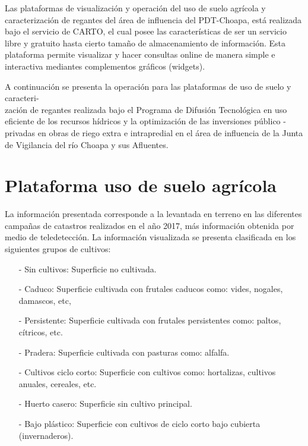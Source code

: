 \documentclass[10pt]{article}
\begin{document}
Las plataformas de visualización y operación del uso de suelo agrícola y caracterización de regantes del área de influencia del PDT-Choapa, está realizada bajo el servicio de CARTO, el cual posee las características de ser un servicio libre y gratuito hasta cierto tamaño de almacenamiento de información. Esta plataforma permite visualizar y hacer consultas online de manera simple e interactiva mediantes complementos gráficos (widgets).  \bigskip\setlength{\parindent}{0pt}

A continuación se presenta la operación para las plataformas de uso de suelo y caracteri-\\zación de regantes realizada bajo el Programa de Difusión Tecnológica en uso eficiente de los recursos hídricos y la optimización de las inversiones público - privadas en obras de riego extra e intrapredial en el área de influencia de la Junta de Vigilancia del río Choapa y  sus Afluentes.
\newpage

\section{Plataforma uso de suelo agrícola}


La información presentada corresponde a la levantada en terreno en las diferentes campañas de catastros realizados en el año 2017, más información obtenida por medio de teledetección. 
La información visualizada se presenta clasificada en los siguientes grupos de cultivos:

\begin{itemize}

\item[-]Sin cultivos: Superficie no cultivada.
\item[-]Caduco: Superficie cultivada con frutales caducos como: vides, nogales, damascos, etc,
\item[-]Persistente: Superficie cultivada con frutales persistentes como: paltos, cítricos, etc.
\item[-]Pradera: Superficie cultivada con pasturas como: alfalfa.
\item[-]Cultivos ciclo corto: Superficie con cultivos como: hortalizas, cultivos anuales, cereales, etc.
\item[-]Huerto casero: Superficie sin cultivo principal.
\item[-]Bajo plástico: Superficie con cultivos de ciclo corto bajo cubierta (invernaderos). \bigskip\setlength{\parindent}{0pt}
\end{itemize}
\end{document}
